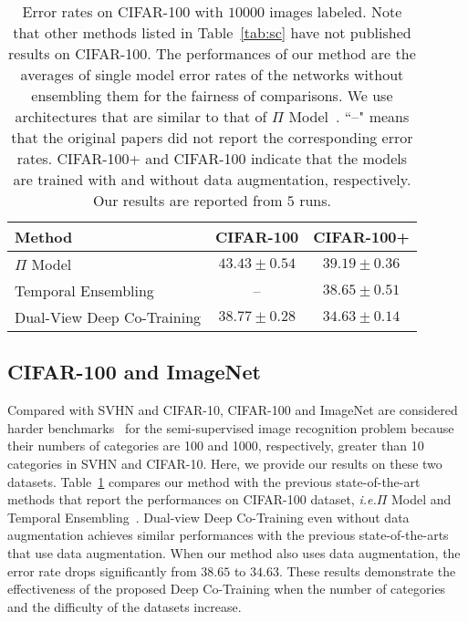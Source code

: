 \documentclass[runningheads]{llncs}
\begin{document}
\begin{table}
  \setlength{\tabcolsep}{4pt}
  \centering
  \begin{tabular}{lcc}
    \toprule
    Method & CIFAR-100 & CIFAR-100+ \\
    \midrule
    $\Pi$ Model~\cite{tessl} & $43.43\pm0.54$ & $39.19\pm0.36$\\
    Temporal Ensembling~\cite{tessl} & -- & $38.65\pm0.51$ \\
    \midrule
    Dual-View Deep Co-Training & $\mathbf{38.77\pm0.28}$ & $\mathbf{34.63\pm0.14}$ \\
    \bottomrule
  \end{tabular}
  \vspace{0.05in}
  \caption{Error rates on CIFAR-100 with $10000$ images labeled.
  Note that other methods listed in Table~\ref{tab:sc} have not published results on CIFAR-100.
  The performances of our method are the averages of single model error rates of the networks without ensembling them for the fairness of comparisons.
  We use architectures that are similar to that of $\Pi$ Model~\cite{tessl}.
  ``--" means that the original papers did not report the corresponding error rates.
  CIFAR-100+ and CIFAR-100 indicate that the models are trained with and without data augmentation, respectively.
  Our results are reported from $5$ runs.}
  \label{tab:c100}
\end{table}\subsection{CIFAR-100 and ImageNet}

Compared with SVHN and CIFAR-10, CIFAR-100 and ImageNet are considered harder benchmarks~\cite{tessl} for the semi-supervised image recognition problem because their numbers of categories are 100 and 1000, respectively,  greater than 10 categories in SVHN and CIFAR-10.
Here, we provide our results on these two datasets.
Table~\ref{tab:c100} compares our method with the previous state-of-the-art methods that report the performances on CIFAR-100 dataset, \textit{i.e.}$\Pi$ Model and Temporal Ensembling~\cite{tessl}.
Dual-view Deep Co-Training even without data augmentation achieves similar performances with the previous state-of-the-arts that use data augmentation.
When our method also uses data augmentation, the error rate drops significantly from $38.65$ to $34.63$.
These results demonstrate the effectiveness of the proposed Deep Co-Training when the number of categories and the difficulty of the datasets increase.
\end{document}

